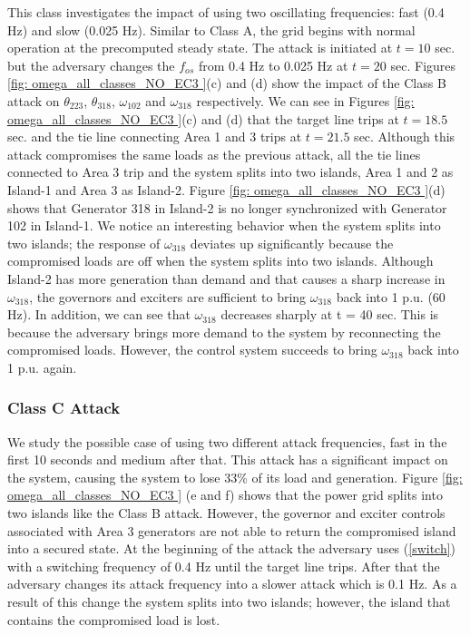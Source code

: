 \documentclass[journal]{IEEEtran}
\begin{document}
This class investigates the impact of using two oscillating frequencies: fast (0.4 Hz) and slow (0.025 Hz). Similar to Class A, the grid begins with normal operation at the precomputed steady state. The attack is initiated at $t = 10$ sec. but the adversary changes the $f_{os}$ from 0.4 Hz to 0.025 Hz at $t = 20$ sec. Figures \ref{fig: omega_all_classes_NO_EC3 }(c) and (d) show the impact of the Class B attack on $ \theta_{223}$, $\theta_{318} $, $ \omega_{102}$ and $\omega_{318}$ respectively. We can see in Figures \ref{fig: omega_all_classes_NO_EC3 }(c) and (d) that the target line trips at $t=18.5$ sec. and the tie line connecting Area 1 and 3 trips at $ t=21.5$ sec. Although this attack compromises the same loads as the previous attack, all the tie lines connected to Area 3 trip and the system splits into two islands, Area 1 and 2 as Island-1 and Area 3 as Island-2. Figure \ref{fig: omega_all_classes_NO_EC3 }(d) shows that Generator 318 in Island-2 is no longer synchronized with Generator 102 in Island-1. We notice an interesting behavior when the system splits into two islands; the response of $\omega_{318}$ deviates up significantly because the compromised loads are off when the system splits into two islands. Although Island-2 has more generation than demand and that causes a sharp increase in $\omega_{318}$, the governors and exciters are sufficient to bring $\omega_{318}$ back into 1 p.u. (60 Hz). In addition, we can see that $\omega_{318}$ decreases sharply at t = 40 sec. This is because the adversary brings more demand to the system by reconnecting the compromised loads. However, the control system succeeds to bring $\omega_{318}$ back into 1 p.u. again.









\subsubsection{Class C Attack}

We study the possible case of using two different attack frequencies, fast in the first 10 seconds and medium after that. This attack has a significant impact on the system, causing the system to lose 33\% of its load and generation. Figure \ref{fig: omega_all_classes_NO_EC3 } (e and f) shows that the power grid splits into two islands like the Class B attack. However, the governor and exciter controls associated with Area 3 generators are not able to return the compromised island into a secured state. At the beginning of the attack the adversary uses (\ref{switch}) with a switching frequency of 0.4 Hz until the target line trips. After that the adversary changes its attack frequency into a slower attack which is 0.1 Hz. As a result of this change the system splits into two islands; however, the island that contains the compromised load is lost.  
\end{document}
